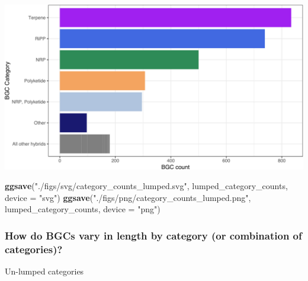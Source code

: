 \documentclass[
]{article}
\newenvironment{Shaded}{\begin{snugshade}}{\end{snugshade}}
\newcommand{\AttributeTok}[1]{\textcolor[rgb]{0.13,0.29,0.53}{#1}}
\newcommand{\FunctionTok}[1]{\textcolor[rgb]{0.13,0.29,0.53}{\textbf{#1}}}
\newcommand{\NormalTok}[1]{#1}
\newcommand{\StringTok}[1]{\textcolor[rgb]{0.31,0.60,0.02}{#1}}
\begin{document}
\includegraphics{analysis_files/figure-latex/unnamed-chunk-9-1.pdf}

\begin{Shaded}
\begin{Highlighting}[]
\FunctionTok{ggsave}\NormalTok{(}\StringTok{"./figs/svg/category\_counts\_lumped.svg"}\NormalTok{, lumped\_category\_counts, }\AttributeTok{device =} \StringTok{"svg"}\NormalTok{)}
\FunctionTok{ggsave}\NormalTok{(}\StringTok{"./figs/png/category\_counts\_lumped.png"}\NormalTok{, lumped\_category\_counts, }\AttributeTok{device =} \StringTok{"png"}\NormalTok{)}
\end{Highlighting}
\end{Shaded}

\hypertarget{how-do-bgcs-vary-in-length-by-category-or-combination-of-categories}{%
\subsubsection{How do BGCs vary in length by category (or combination of
categories)?}\label{how-do-bgcs-vary-in-length-by-category-or-combination-of-categories}}

Un-lumped categories
\end{document}
